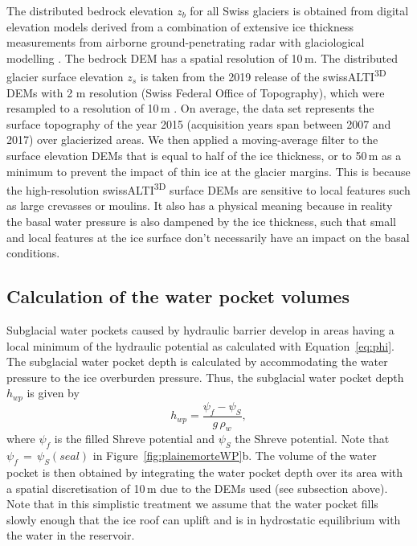 The distributed bedrock elevation $z_b$ for all Swiss glaciers is obtained from digital elevation models derived from a combination of extensive ice thickness measurements from airborne ground-penetrating radar with glaciological modelling \citep{Grab&al2021}. The bedrock DEM has a spatial resolution of 10\,m. The distributed glacier surface elevation $z_s$ is taken from the 2019 release of the swissALTI\textsuperscript{3D} DEMs with 2 m resolution (Swiss Federal Office of Topography), which were resampled to a resolution of 10\,m \citep{Grab&al2021}. On average, the data set represents the surface topography of the year 2015 (acquisition years span between 2007 and 2017) over glacierized areas. We then applied a moving-average filter to the surface elevation DEMs that is equal to half of the ice thickness, or to 50\,m as a minimum to prevent the impact of thin ice at the glacier margins. This is because the high-resolution swissALTI\textsuperscript{3D} surface DEMs are sensitive to local features such as large crevasses or moulins. It also has a physical meaning because in reality the basal water pressure is also dampened by the ice thickness, such that small and local features at the ice surface don't necessarily have an impact on the basal conditions.


\subsection{ Calculation of the water pocket volumes}

Subglacial water pockets caused by hydraulic barrier develop in areas having a local minimum of the hydraulic potential as calculated with Equation~\ref{eq:phi}. The subglacial water pocket depth is calculated by accommodating the water pressure to the ice overburden pressure. Thus, the subglacial water pocket depth $h_{wp}$ is given by
%
\begin{equation}
     h_{wp} = \frac{\psi_{f} - \psi_{S}}{g\,\rho_w},
\end{equation}
%
where $\psi_{f}$ is the filled Shreve potential and $\psi_S$ the Shreve potential. Note that $\psi_{f}\,=\,\psi_S (seal)$ in Figure~\ref{fig:plainemorteWP}b. The volume of the water pocket is then obtained by integrating the water pocket depth over its area with a spatial discretisation of 10\,m due to the DEMs used (see subsection above). Note that in this simplistic treatment we assume that the water pocket fills slowly enough that the ice roof can uplift and is in hydrostatic equilibrium with the water in the reservoir.
%


